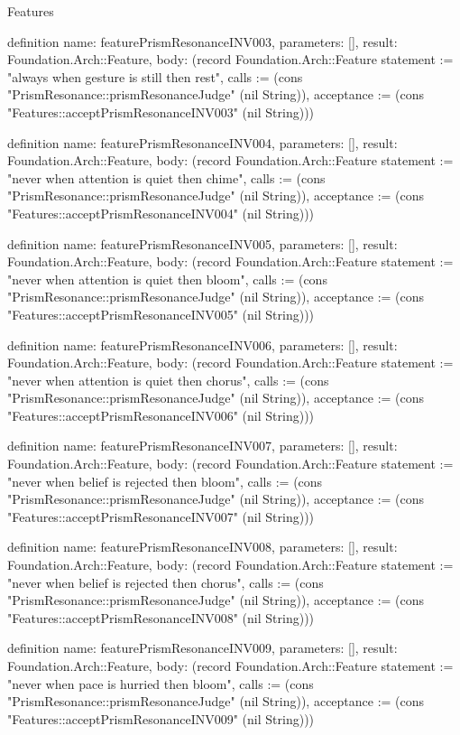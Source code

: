 \begin{lexlean}{Features}
\begin{semanticmodule}
definition{
  name: featurePrismResonanceINV003,
  parameters: [],
  result: Foundation.Arch::Feature,
  body: (record Foundation.Arch::Feature {statement := "always when gesture is still then rest", calls := (cons "PrismResonance::prismResonanceJudge" (nil String)), acceptance := (cons "Features::acceptPrismResonanceINV003" (nil String))})
}

definition{
  name: featurePrismResonanceINV004,
  parameters: [],
  result: Foundation.Arch::Feature,
  body: (record Foundation.Arch::Feature {statement := "never when attention is quiet then chime", calls := (cons "PrismResonance::prismResonanceJudge" (nil String)), acceptance := (cons "Features::acceptPrismResonanceINV004" (nil String))})
}

definition{
  name: featurePrismResonanceINV005,
  parameters: [],
  result: Foundation.Arch::Feature,
  body: (record Foundation.Arch::Feature {statement := "never when attention is quiet then bloom", calls := (cons "PrismResonance::prismResonanceJudge" (nil String)), acceptance := (cons "Features::acceptPrismResonanceINV005" (nil String))})
}

definition{
  name: featurePrismResonanceINV006,
  parameters: [],
  result: Foundation.Arch::Feature,
  body: (record Foundation.Arch::Feature {statement := "never when attention is quiet then chorus", calls := (cons "PrismResonance::prismResonanceJudge" (nil String)), acceptance := (cons "Features::acceptPrismResonanceINV006" (nil String))})
}

definition{
  name: featurePrismResonanceINV007,
  parameters: [],
  result: Foundation.Arch::Feature,
  body: (record Foundation.Arch::Feature {statement := "never when belief is rejected then bloom", calls := (cons "PrismResonance::prismResonanceJudge" (nil String)), acceptance := (cons "Features::acceptPrismResonanceINV007" (nil String))})
}

definition{
  name: featurePrismResonanceINV008,
  parameters: [],
  result: Foundation.Arch::Feature,
  body: (record Foundation.Arch::Feature {statement := "never when belief is rejected then chorus", calls := (cons "PrismResonance::prismResonanceJudge" (nil String)), acceptance := (cons "Features::acceptPrismResonanceINV008" (nil String))})
}

definition{
  name: featurePrismResonanceINV009,
  parameters: [],
  result: Foundation.Arch::Feature,
  body: (record Foundation.Arch::Feature {statement := "never when pace is hurried then bloom", calls := (cons "PrismResonance::prismResonanceJudge" (nil String)), acceptance := (cons "Features::acceptPrismResonanceINV009" (nil String))})
}


\end{semanticmodule}
\end{lexlean}
